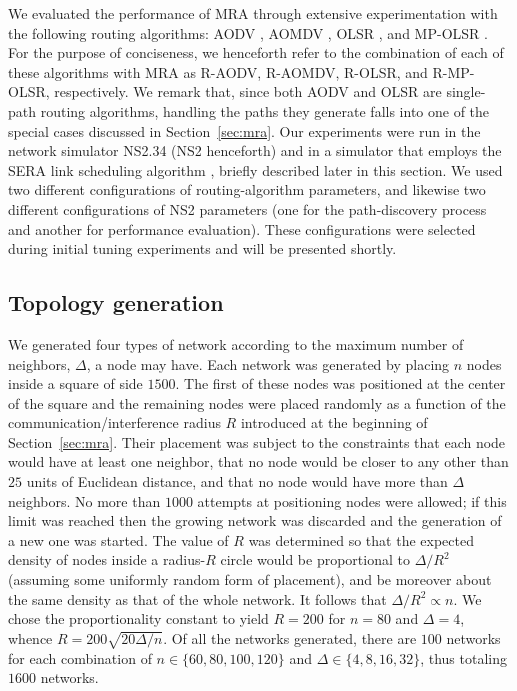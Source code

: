 \documentclass{article}
\begin{document}
We evaluated the performance of MRA through extensive experimentation with the
following routing algorithms: AODV \cite{Perkins1999}, AOMDV \cite{Marina2002},
OLSR \cite{Jacquet2001}, and MP-OLSR \cite{Yi2011}. For the purpose of
conciseness, we henceforth refer to the combination of each of these algorithms
with MRA as R-AODV, R-AOMDV, R-OLSR, and R-MP-OLSR, respectively. We remark
that, since both AODV and OLSR are single-path routing algorithms, handling the
paths they generate falls into one of the special cases discussed in
Section~\ref{sec:mra}. Our experiments were run in the network simulator NS2.34
(NS2 henceforth) \cite{ns2} and in a simulator that employs the SERA link
scheduling algorithm \cite{Fabio2012}, briefly described later in this section.
We used two different configurations of routing-algorithm parameters, and
likewise two different configurations of NS2 parameters (one for the
path-discovery process and another for performance evaluation). These
configurations were selected during initial tuning experiments and will be
presented shortly.

\subsection{Topology generation}

We generated four types of network according to the maximum number of neighbors,
$\Delta$, a node may have.  Each network was generated by placing $n$ nodes
inside a square of side $1500$. The first of these nodes was positioned at the
center of the square and the remaining nodes were placed randomly as a function
of the communication/interference radius $R$ introduced at the beginning of
Section~\ref{sec:mra}. Their placement was subject to the constraints that each
node would have at least one neighbor, that no node would be closer to any other
than $25$ units of Euclidean distance, and that no node would have more than
$\Delta$ neighbors. No more than $1000$ attempts at positioning nodes were
allowed; if this limit was reached then the growing network was discarded and
the generation of a new one was started. The value of $R$ was determined so
that the expected density of nodes inside a radius-$R$ circle would be
proportional to $\Delta/R^2$ (assuming some uniformly random form of placement),
and be moreover about the same density as that of the whole network. It follows
that $\Delta/R^2 \propto n$. We chose the proportionality constant to yield
$R=200$ for $n=80$ and $\Delta=4$, whence $R=200\sqrt{20\Delta/n}$. Of all the
networks generated, there are $100$ networks for each combination of
$n\in\{60,80,100,120\}$ and $\Delta\in\{4,8,16,32\}$, thus totaling $1600$
networks.
\end{document}
